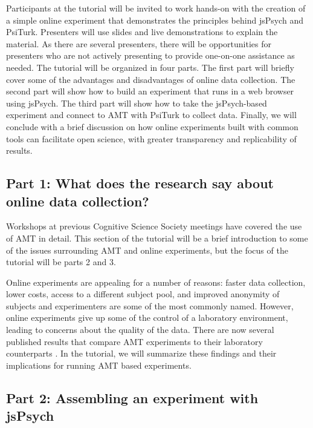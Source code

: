 \documentclass[10pt,letterpaper]{article}
\begin{document}
Participants at the tutorial will be invited to work hands-on with the creation of a simple online experiment that demonstrates the principles behind jsPsych and PsiTurk. Presenters will use slides and live demonstrations to explain the material. As there are several presenters, there will be opportunities for presenters who are not actively presenting to provide one-on-one assistance as needed. The tutorial will be organized in four parts. The first part will briefly cover some of the advantages and disadvantages of online data collection. The second part will show how to build an experiment that runs in a web browser using jsPsych. The third part will show how to take the jsPsych-based experiment and connect to AMT with PsiTurk to collect data. Finally, we will conclude with a brief discussion on how online experiments built with common tools can facilitate open science, with greater transparency and replicability of results.

\subsection{Part 1: What does the research say about online data collection?}

Workshops at previous Cognitive Science Society meetings have covered the use of AMT in detail. This section of the tutorial will be a brief introduction to some of the issues surrounding AMT and online experiments, but the focus of the tutorial will be parts 2 and 3.

Online experiments are appealing for a number of reasons: faster data collection, lower costs, access to a different subject pool, and improved anonymity of subjects and experimenters are some of the most commonly named. However, online experiments give up some of the control of a laboratory environment, leading to concerns about the quality of the data. There are now several published results that compare AMT experiments to their laboratory counterparts \cite{paolacci2010running, buhrmester2011amazon, zwann2012revisiting, crump2013evaluating, goodman2013data}. In the tutorial, we will summarize these findings and their implications for running AMT based experiments. 
  
\subsection{Part 2: Assembling an experiment with jsPsych}
\end{document}

